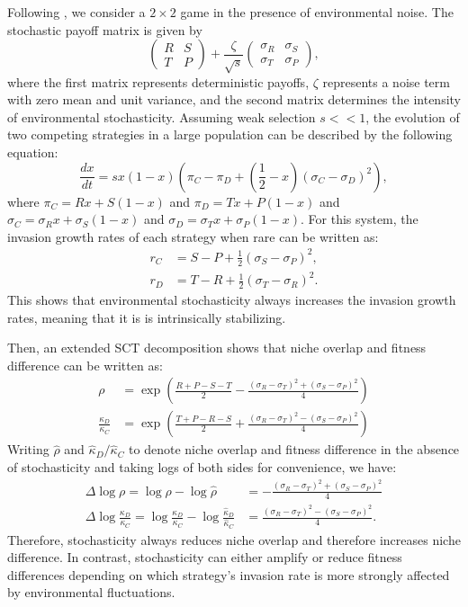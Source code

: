 \documentclass[12pt]{article}
\begin{document}
Following \cite{wang2025evolution}, we consider a $2×2$ game in the presence of environmental noise. 
The stochastic payoff matrix is given by
\begin{equation}
\begin{pmatrix}
R & S \\
T & P
\end{pmatrix} +
\frac{\zeta}{\sqrt{s}} \begin{pmatrix}
\sigma_R & \sigma_S \\
\sigma_T & \sigma_P
\end{pmatrix}, 
\end{equation}
where the first matrix represents deterministic payoffs,
$\zeta$ represents a noise term with zero mean and unit variance,
and the second matrix determines the intensity of environmental stochasticity.
Assuming weak selection $s<<1$, the evolution of two competing strategies in a large population can be described by the following equation:
\begin{equation}
\frac{dx}{dt} = s x (1-x) \left(\pi_C - \pi_D + \left(\frac{1}{2} - x \right) (\sigma_C - \sigma_D)^2 \right),
\end{equation}
where $\pi_C = Rx + S(1-x)$ and $\pi_D = T x + P(1-x)$ and $\sigma_C = \sigma_R x + \sigma_S (1-x)$ and $\sigma_D = \sigma_T x + \sigma_P (1-x)$.
For this system, the invasion growth rates of each strategy when rare can be written as:
\begin{align}
r_C &= S - P + \frac{1}{2}(\sigma_S - \sigma_P)^2,\\
r_D &= T - R + \frac{1}{2}(\sigma_T - \sigma_R)^2. 
\end{align}
This shows that environmental stochasticity always increases the invasion growth rates, meaning that it is is intrinsically stabilizing.

Then, an extended SCT decomposition shows that niche overlap and fitness difference can be written as:
\begin{align}
\rho &= \exp\left(\frac{R+P-S-T}{2} - \frac{(\sigma_R - \sigma_T)^2 + (\sigma_S - \sigma_P)^2}{4} \right)\\
\frac{\kappa_D}{\kappa_C} &= \exp\left(\frac{T+P-R-S}{2} + \frac{(\sigma_R - \sigma_T)^2 - (\sigma_S - \sigma_P)^2}{4} \right)
\end{align}
Writing $\hat{\rho}$ and $\hat{\kappa}_D/\hat{\kappa}_C$ to denote niche overlap and fitness difference in the absence of stochasticity and taking logs of both sides for convenience, we have:
\begin{align}
\Delta \log \rho = \log \rho -  \log  \hat{\rho}&=- \frac{(\sigma_R - \sigma_T)^2 + (\sigma_S - \sigma_P)^2}{4}\\
\Delta \log \frac{\kappa_D}{\kappa_C} = \log \frac{\kappa_D}{\kappa_C}-\log \frac{\hat{\kappa}_D}{\hat{\kappa}_C} &= \frac{(\sigma_R - \sigma_T)^2 - (\sigma_S - \sigma_P)^2}{4}.
\end{align}
Therefore, stochasticity always reduces niche overlap and therefore increases niche difference.
In contrast, stochasticity can either amplify or reduce fitness differences depending on which strategy’s invasion rate is more strongly affected by environmental fluctuations.
\end{document}
